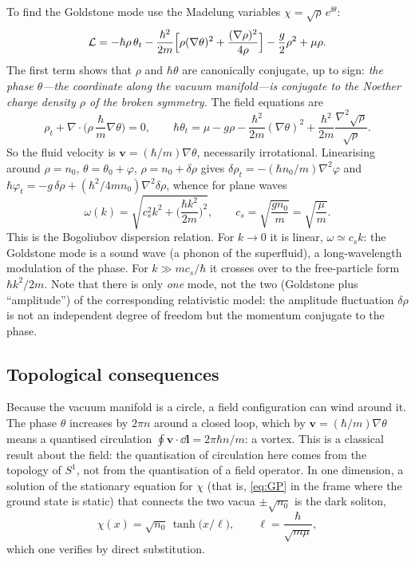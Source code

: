 To find the Goldstone mode use the Madelung variables $\chi=\sqrt\rho\,e^{\ii\theta}$:
\begin{equation}
  \mathcal{L}=-\hbar\rho\,\theta_t-\frac{\hbar^2}{2m}\Big[\rho(\nabla\theta)^2+\frac{(\nabla\rho)^2}{4\rho}\Big]
  -\frac g2\rho^2+\mu\rho .
  \label{eq:madelung-L}
\end{equation}
The first term shows that $\rho$ and $\hbar\theta$ are canonically conjugate, up to
sign: \emph{the phase $\theta$---the coordinate along the vacuum manifold---is conjugate to
the Noether charge density $\rho$ of the broken symmetry.} The field equations are
\begin{equation}
  \rho_t+\nabla\!\cdot\!\Big(\rho\,\frac{\hbar}{m}\nabla\theta\Big)=0,\qquad
  \hbar\theta_t=\mu-g\rho-\frac{\hbar^2}{2m}(\nabla\theta)^2+\frac{\hbar^2}{2m}\frac{\nabla^2\sqrt\rho}{\sqrt\rho}.
\end{equation}
So the fluid velocity is $\mathbf{v}=(\hbar/m)\nabla\theta$, necessarily irrotational. Linearising around $\rho=n_0$,
$\theta=\theta_0+\varphi$, $\rho=n_0+\delta\rho$ gives
$\delta\rho_t=-(\hbar n_0/m)\nabla^2\varphi$ and
$\hbar\varphi_t=-g\,\delta\rho+(\hbar^2/4mn_0)\nabla^2\delta\rho$, whence for plane waves
\begin{equation}
  \omega(k)=\sqrt{c_s^2k^2+\Big(\frac{\hbar k^2}{2m}\Big)^2},\qquad c_s=\sqrt{\frac{gn_0}{m}}=\sqrt{\frac{\mu}{m}} .
  \label{eq:bogoliubov}
\end{equation}
This is the Bogoliubov dispersion relation. For $k\to0$ it is linear,
$\omega\simeq c_s k$: the Goldstone mode is a sound wave (a phonon of the
superfluid), a long-wavelength modulation of the phase. For
$k\gg mc_s/\hbar$ it crosses over to the free-particle form $\hbar k^2/2m$. Note that
there is only \emph{one} mode, not the two (Goldstone plus ``amplitude'') of the corresponding
relativistic model: the amplitude fluctuation $\delta\rho$ is not an independent degree
of freedom but the momentum conjugate to the phase.

\subsection{Topological consequences}

Because the vacuum manifold is a circle, a field configuration can wind around it. The
phase $\theta$ increases by $2\pi n$ around a closed loop, which by $\mathbf{v}=(\hbar/m)\nabla\theta$ means a
quantised circulation $\oint\mathbf{v}\!\cdot\!\dd\mathbf{l}=2\pi\hbar n/m$: a vortex. This
is a classical result about the field: the quantisation of circulation here comes from the
topology of $S^1$, not from the quantisation of a field operator. In one dimension, a
solution of the stationary equation for $\chi$ (that is, \eqref{eq:GP} in the frame where the ground state is static)
that connects the two vacua $\pm\sqrt{n_0}$ is the dark soliton,
\begin{equation}
  \chi(x)=\sqrt{n_0}\,\tanh\!\big(x/\ell\big),\qquad \ell=\frac{\hbar}{\sqrt{m\mu}},
\end{equation}
which one verifies by direct substitution.

